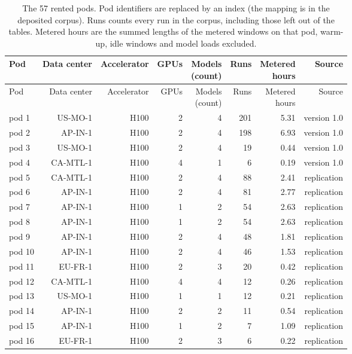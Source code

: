 \begingroup
\footnotesize
\setlength{\tabcolsep}{4pt}
\begin{longtable}{lrrrrrrr}
\caption{The 57 rented pods. Pod identifiers are replaced by an index (the mapping is in the deposited corpus). Runs counts every run in the corpus, including those left out of the tables. Metered hours are the summed lengths of the metered windows on that pod, warm-up, idle windows and model loads excluded.}\label{tab:pods}\\
\toprule
Pod & Data center & Accelerator & GPUs & \makecell[r]{Models\\(count)} & Runs & \makecell[r]{Metered\\hours} & Source \\
\midrule
\endfirsthead
\toprule
Pod & Data center & Accelerator & GPUs & \makecell[r]{Models\\(count)} & Runs & \makecell[r]{Metered\\hours} & Source \\
\midrule
\endhead
\bottomrule
\endfoot
pod 1 & US-MO-1 & H100 & 2 & 4 & 201 & 5.31 & version 1.0 \\
pod 2 & AP-IN-1 & H100 & 2 & 4 & 198 & 6.93 & version 1.0 \\
pod 3 & US-MO-1 & H100 & 2 & 4 & 19 & 0.44 & version 1.0 \\
pod 4 & CA-MTL-1 & H100 & 4 & 1 & 6 & 0.19 & version 1.0 \\
pod 5 & CA-MTL-1 & H100 & 2 & 4 & 88 & 2.41 & replication \\
pod 6 & AP-IN-1 & H100 & 2 & 4 & 81 & 2.77 & replication \\
pod 7 & AP-IN-1 & H100 & 1 & 2 & 54 & 2.63 & replication \\
pod 8 & AP-IN-1 & H100 & 1 & 2 & 54 & 2.63 & replication \\
pod 9 & AP-IN-1 & H100 & 2 & 4 & 48 & 1.81 & replication \\
pod 10 & AP-IN-1 & H100 & 2 & 4 & 46 & 1.53 & replication \\
pod 11 & EU-FR-1 & H100 & 2 & 3 & 20 & 0.42 & replication \\
pod 12 & CA-MTL-1 & H100 & 4 & 4 & 12 & 0.26 & replication \\
pod 13 & US-MO-1 & H100 & 1 & 1 & 12 & 0.21 & replication \\
pod 14 & AP-IN-1 & H100 & 2 & 2 & 11 & 0.54 & replication \\
pod 15 & AP-IN-1 & H100 & 1 & 2 & 7 & 1.09 & replication \\
pod 16 & EU-FR-1 & H100 & 2 & 3 & 6 & 0.22 & replication \\

\end{longtable}
